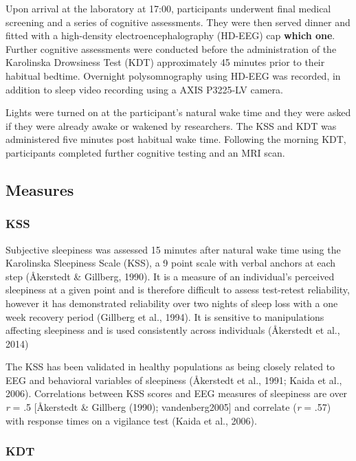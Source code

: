 \documentclass[
]{article}
\begin{document}
Upon arrival at the laboratory at 17:00, participants underwent final
medical screening and a series of cognitive assessments. They were then
served dinner and fitted with a high-density electroencephalography
(HD-EEG) cap \textbf{which one}. Further cognitive assessments were
conducted before the administration of the Karolinska Drowsiness Test
(KDT) approximately 45 minutes prior to their habitual bedtime.
Overnight polysomnography using HD-EEG was recorded, in addition to
sleep video recording using a AXIS P3225-LV camera.

Lights were turned on at the participant's natural wake time and they
were asked if they were already awake or wakened by researchers. The KSS
and KDT was administered five minutes post habitual wake time. Following
the morning KDT, participants completed further cognitive testing and an
MRI scan.

\subsection{Measures}\label{measures}

\subsubsection{KSS}\label{kss}

Subjective sleepiness was assessed 15 minutes after natural wake time
using the Karolinska Sleepiness Scale (KSS), a 9 point scale with verbal
anchors at each step (Åkerstedt \& Gillberg, 1990). It is a measure of
an individual's perceived sleepiness at a given point and is therefore
difficult to assess test-retest reliability, however it has demonstrated
reliability over two nights of sleep loss with a one week recovery
period (Gillberg et al., 1994). It is sensitive to manipulations
affecting sleepiness and is used consistently across individuals
(Åkerstedt et al., 2014)

The KSS has been validated in healthy populations as being closely
related to EEG and behavioral variables of sleepiness (Åkerstedt et al.,
1991; Kaida et al., 2006). Correlations between KSS scores and EEG
measures of sleepiness are over \emph{r} = .5 {[}Åkerstedt \& Gillberg
(1990); vandenberg2005{]} and correlate (\emph{r} = .57) with response
times on a vigilance test (Kaida et al., 2006).

\subsubsection{KDT}\label{kdt}
\end{document}
